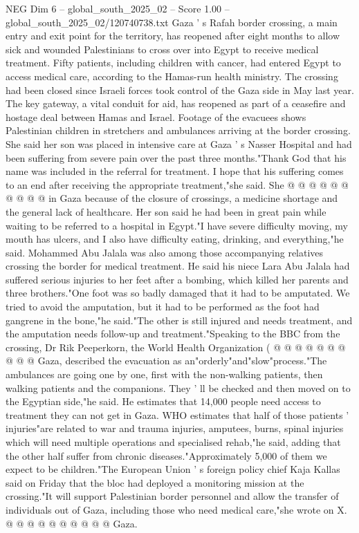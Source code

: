 \begin{textsample}{NEG Dim 6 – global\_south\_2025\_02 – Score 1.00 – global\_south\_2025\_02/120740738.txt}  \label{ex:f6_neg_039}
Gaza ' s Rafah border crossing, a main entry and exit point for the territory, has reopened after eight months to allow sick and wounded Palestinians to cross over into Egypt to receive medical treatment.
Fifty patients, including children with cancer, had entered Egypt to access medical care, according to the Hamas-run health ministry.
The crossing had been closed since Israeli forces took control of the Gaza side in May last year.
The key gateway, a vital conduit for aid, has reopened as part of a ceasefire and hostage deal between Hamas and Israel.
Footage of the evacuees shows Palestinian children in stretchers and ambulances arriving at the border crossing.
She said her son was placed in intensive care at Gaza ' s Nasser Hospital and had been suffering from severe pain over the past three months."Thank God that his name was included in the referral for treatment.
I hope that his suffering comes to an end after receiving the appropriate treatment,"she said.
She @ @ @ @ @ @ @ @ @ @ in Gaza because of the closure of crossings, a medicine shortage and the general lack of healthcare.
Her son said he had been in great pain while waiting to be referred to a hospital in Egypt."I have severe difficulty moving, my mouth has ulcers, and I also have difficulty eating, drinking, and everything,"he said.
Mohammed Abu Jalala was also among those accompanying relatives crossing the border for medical treatment.
He said his niece Lara Abu Jalala had suffered serious injuries to her feet after a bombing, which killed her parents and three brothers."One foot was so badly damaged that it had to be amputated.
We tried to avoid the amputation, but it had to be performed as the foot had gangrene in the bone,"he said."The other is still injured and needs treatment, and the amputation needs follow-up and treatment."Speaking to the BBC from the crossing, Dr Rik Peeperkorn, the World Health Organization ( @ @ @ @ @ @ @ @ @ @ Gaza, described the evacuation as an"orderly"and"slow"process."The ambulances are going one by one, first with the non-walking patients, then walking patients and the companions.
They ' ll be checked and then moved on to the Egyptian side,"he said.
He estimates that 14,000 people need access to treatment they can not get in Gaza.
WHO estimates that half of those patients ' injuries"are related to war and trauma injuries, amputees, burns, spinal injuries which will need multiple operations and specialised rehab,"he said, adding that the other half suffer from chronic diseases."Approximately 5,000 of them we expect to be children."The European Union ' s foreign policy chief Kaja Kallas said on Friday that the bloc had deployed a monitoring mission at the crossing."It will support Palestinian border personnel and allow the transfer of individuals out of Gaza, including those who need medical care,"she wrote on X. @ @ @ @ @ @ @ @ @ @ Gaza.

\end{textsample}
